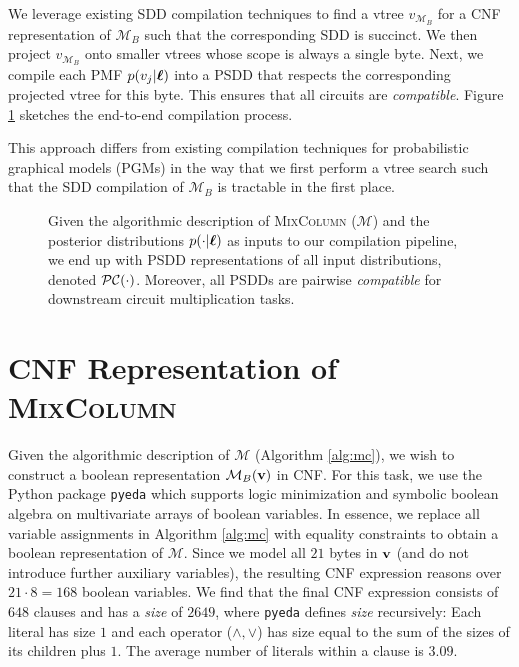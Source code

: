 We leverage existing SDD compilation techniques \cite{dynamic_min_choi} to find a vtree $v_{\mathcal{M}_B}$ for a CNF representation of $\mathcal{M}_B$ such that the corresponding SDD is succinct. We then project $v_{\mathcal{M}_B}$ onto smaller vtrees whose scope is always a single byte. Next, we compile each PMF $p(v_j | \boldsymbol{\ell})$ into a PSDD that respects the corresponding projected vtree for this byte. This ensures that all circuits are \textit{compatible}. Figure \ref{fig:compilation} sketches the end-to-end compilation process.

This approach differs from existing compilation techniques for probabilistic graphical models (PGMs) \cite{sbn, tractable_ops} in the way that we first perform a vtree search such that the SDD compilation of $\mathcal{M}_B$ is tractable in the first place.

\begin{figure}[ht]
    \makebox[\textwidth][c]{
        \scalebox{0.70}{
            
        }
    }%

    \caption{Given the algorithmic description of \textsc{MixColumn} ($\mathcal{M}$) and the posterior distributions $p(\cdot | \boldsymbol{\ell})$ as inputs to our compilation pipeline, we end up with PSDD representations of all input distributions, denoted $\mathcal{PC}(\cdot)$. Moreover, all PSDDs are pairwise \textit{compatible} for downstream circuit multiplication tasks.}
    \label{fig:compilation}
\end{figure}

\section{CNF Representation of \textsc{MixColumn}}
Given the algorithmic description of $\mathcal{M}$ (Algorithm \ref{alg:mc}), we wish to construct a boolean representation $\mathcal{M}_B(\mathbf{v})$ in CNF.
For this task, we use the Python package \texttt{pyeda} \cite{pyeda} which supports logic minimization and symbolic boolean algebra on multivariate arrays of boolean variables. In essence, we replace all variable assignments in Algorithm \ref{alg:mc} with equality constraints to obtain a boolean representation of $\mathcal{M}$. Since we model all $21$ bytes in $\mathbf{v}$ (and do not introduce further auxiliary variables), the resulting CNF expression reasons over $21 \cdot 8 = 168$ boolean variables. We find that the final CNF expression consists of $648$ clauses and has a \textit{size} of $2649$, where \texttt{pyeda} defines \textit{size} recursively: Each literal has size $1$ and each operator ($\land, \lor$) has size equal to the sum of the sizes of its children plus $1$. The average number of literals within a clause is $3.09$.

